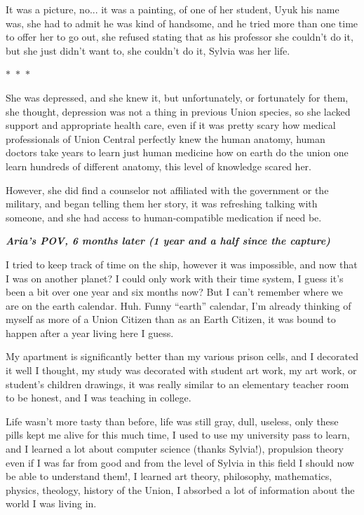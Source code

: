 \documentclass[colorlinks,12pt,a4paper]{book}
\newcommand\sep{\begin{center}
  \boldmath $\ast$~$\ast$~$\ast$
\end{center}}
\begin{document}
It was a picture, no... it was a painting, of one of her student, Uyuk his name was, she had to admit he was kind of handsome, 
and he tried more than one time to offer her to go out, she refused stating that as his professor she couldn't do it, 
but she just didn't want to, she couldn't do it, Sylvia was her life.

\sep

She was depressed, and she knew it, but unfortunately, or fortunately for them, she thought, depression was not a thing 
in previous Union species, so she lacked support and appropriate health care, even if it was pretty scary how medical 
professionals of Union Central perfectly knew the human anatomy, human doctors take years to learn just human medicine
 how on earth do the union one learn hundreds of different anatomy, this level of knowledge scared her.\par
 \bigskip

However, she did find a counselor not affiliated with the government or the military, and began telling them her story, 
it was refreshing talking with someone, and she had access to human-compatible medication if need be.\par
\bigskip

\textit{\textbf{Aria's POV, 6 months later (1 year and a half since the capture)}}\par
\bigskip

I tried to keep track of time on the ship, however it was impossible, and now that I was on another planet? I could only work 
with their time system, I guess it's been a bit over one year and six months now? But I can't remember where we are on 
the earth calendar. Huh. Funny “earth” calendar, I'm already thinking of myself as more of a Union Citizen than as an Earth 
Citizen, it was bound to happen after a year living here I guess.\par
\bigskip

My apartment is significantly better than my various prison cells, and I decorated it well I thought, my study was 
decorated with student art work, my art work, or student's children drawings, it was really similar to an elementary 
teacher room to be honest, and I was teaching in college.\par
\bigskip

Life wasn't more tasty than before, life was still gray, dull, useless, only these pills kept me alive for this much time, 
I used to use my university pass to learn, and I learned a lot about computer science (thanks Sylvia!), propulsion theory 
even if I was far from good and from the level of Sylvia in this field I should now be able to understand them!, 
I learned art theory, philosophy, mathematics, physics, theology, history of the Union, I absorbed a lot of information 
about the world I was living in.\par
\bigskip
\end{document}
